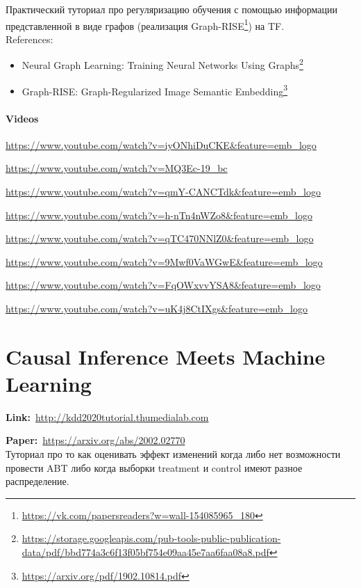 Практический туториал про регуляризацию обучения с помощью информации представленной в виде графов (реализация Graph-RISE\footnote{\url{https://vk.com/papersreaders?w=wall-154085965_180}}) на TF. \\

References:

\begin{itemize}
    \item Neural Graph Learning: Training Neural Networks Using Graphs\footnote{\url{https://storage.googleapis.com/pub-tools-public-publication-data/pdf/bbd774a3c6f13f05bf754e09aa45e7aa6faa08a8.pdf}}
	\item Graph-RISE: Graph-Regularized Image Semantic Embedding\footnote{\url{https://arxiv.org/pdf/1902.10814.pdf}}
\end{itemize}

\paragraph{Videos}

\url{https://www.youtube.com/watch?v=iyONhiDuCKE&feature=emb_logo}

\url{https://www.youtube.com/watch?v=MQ3Ec-19_bc}

\url{https://www.youtube.com/watch?v=qmY-CANCTdk&feature=emb_logo}

\url{https://www.youtube.com/watch?v=h-nTn4nWZo8&feature=emb_logo}

\url{https://www.youtube.com/watch?v=qTC470NNlZ0&feature=emb_logo}

\url{https://www.youtube.com/watch?v=9Mwf0VaWGwE&feature=emb_logo}

\url{https://www.youtube.com/watch?v=FqOWxvvYSA8&feature=emb_logo}

\url{https://www.youtube.com/watch?v=uK4j8CtIXgs&feature=emb_logo}


\section*{Causal Inference Meets Machine Learning} 

\textbf{Link:}~\url{http://kdd2020tutorial.thumedialab.com}

\textbf{Paper:}~\url{https://arxiv.org/abs/2002.02770} \\

Туториал про то как оценивать эффект изменений когда либо нет возможности провести ABT либо когда выборки treatment и control имеют разное распределение.

